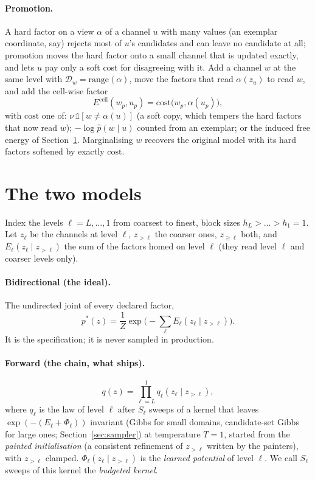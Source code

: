 \documentclass[11pt]{article}
\newcommand{\1}{\mathds{1}}
\newcommand{\Dom}{\mathcal{D}}
\newcommand{\pstar}{p^{*}}
\begin{document}
\paragraph{Promotion.} A hard factor on a view $\alpha$ of a channel $u$ with many values (an
exemplar coordinate, say) rejects most of $u$'s candidates and can leave no candidate at all;
promotion moves the hard factor onto a small channel that is updated exactly, and lets $u$ pay
only a soft cost for disagreeing with it. Add a channel $w$ at the same level with
$\Dom_w = \mathrm{range}(\alpha)$, move the factors that read $\alpha(z_u)$ to read $w$, and add
the cell-wise factor
\begin{equation}
  E^{\mathrm{cell}}(w_p, u_p) = \mathrm{cost}\big(w_p, \alpha(u_p)\big),
\end{equation}
with $\mathrm{cost}$ one of: $\nu\,\1[w \ne \alpha(u)]$ (a soft copy, which tempers the hard
factors that now read $w$); $-\log \hat p(w \mid u)$ counted from an exemplar; or the induced free
energy of Section~\ref{sec:identity}. Marginalising $w$ recovers the original model with its hard
factors softened by exactly $\mathrm{cost}$.

\section{The two models}
\label{sec:identity}

Index the levels $\ell = L, \dots, 1$ from coarsest to finest, block sizes $h_L > \dots > h_1 = 1$.
Let $z_\ell$ be the channels at level $\ell$, $z_{>\ell}$ the coarser ones, $z_{\ge \ell}$ both,
and $E_\ell(z_\ell \mid z_{>\ell})$ the sum of the factors homed on level $\ell$ (they read
level $\ell$ and coarser levels only).

\paragraph{Bidirectional (the ideal).} The undirected joint of every declared factor,
\begin{equation}
  \pstar(z) = \frac{1}{Z}\exp\Big(-\sum_\ell E_\ell(z_\ell \mid z_{>\ell})\Big).
\end{equation}
It is the specification; it is never sampled in production.

\paragraph{Forward (the chain, what ships).}
\begin{equation}
  q(z) = \prod_{\ell = L}^{1} q_\ell(z_\ell \mid z_{>\ell}),
\end{equation}
where $q_\ell$ is the law of level $\ell$ after $S_\ell$ sweeps of a kernel that leaves
$\exp(-(E_\ell + \Phi_\ell))$ invariant (Gibbs for small domains, candidate-set Gibbs for large
ones; Section~\ref{sec:sampler}) at temperature $T = 1$, started from the \emph{painted
initialisation} (a consistent refinement of $z_{>\ell}$ written by the painters), with
$z_{>\ell}$ clamped. $\Phi_\ell(z_\ell \mid z_{>\ell})$ is the \emph{learned potential} of
level $\ell$. We call $S_\ell$ sweeps of this kernel the \emph{budgeted kernel}.
\end{document}

